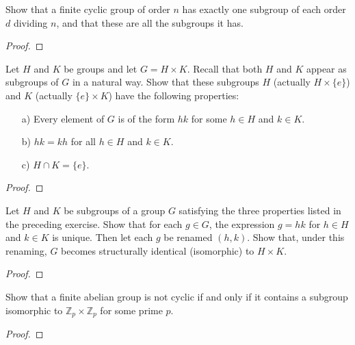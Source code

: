 \begin{theorem}[Exercise 15]\label{Ex15}
    Show that a finite cyclic group of order $n$ has exactly one subgroup of each order $d$ dividing $n$, and that these are all the subgroups it has.
\end{theorem}
\begin{proof}

\end{proof}

\begin{theorem}[Exercise 16]\label{Ex16}
    Let $H$ and $K$ be groups and let $G = H \times K$. Recall that both $H$ and $K$ appear as subgroups of $G$ in a natural way. Show that these subgroups $H$ (actually $H \times \{e\}$) and $K$ (actually $\{e\} \times K$) have the following properties:
    \begin{enumerate}
        \item[a)] Every element of $G$ is of the form $hk$ for some $h \in H$ and $k \in K$.

        \item[b)] $hk = kh$ for all $h \in H$ and $k \in K$.

        \item[c)] $H \cap K = \{e\}$.
    \end{enumerate}
\end{theorem}
\begin{proof}

\end{proof}

\begin{theorem}[Exercise 17]\label{Ex17}
    Let $H$ and $K$ be subgroups of a group $G$ satisfying the three properties listed in the preceding exercise. Show that for each $g \in G$, the expression $g = hk$ for $h \in H$ and $k \in K$ is unique. Then let each $g$ be renamed $(h, k)$. Show that, under this renaming, $G$ becomes structurally identical (isomorphic) to $H \times K$.
\end{theorem}
\begin{proof}

\end{proof}

\begin{theorem}[Exercise 18]\label{Ex18}
    Show that a finite abelian group is not cyclic if and only if it contains a subgroup isomorphic to $\mathbb{Z}_p \times \mathbb{Z}_p$ for some prime $p$.
\end{theorem}
\begin{proof}

\end{proof}

